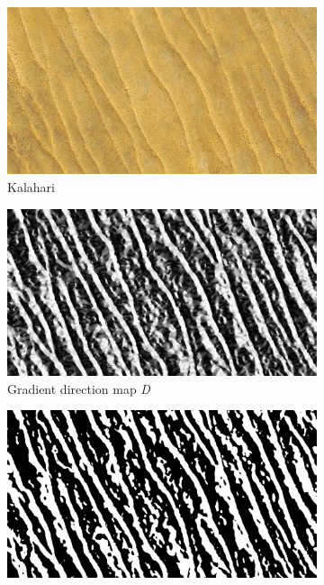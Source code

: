 \begin{figure}[htbp]
	\centering
	\begin{subfigure}[b]{0.3\textwidth}
		\centering
		\includegraphics[width=\linewidth]{figures/kalahari}
		\caption{Kalahari}
		\label{fig:orientation_based_kalahari}
	\end{subfigure}
	\begin{subfigure}[b]{0.3\textwidth}
		\centering
		\includegraphics[width=\linewidth]{figures/gradient_direction_image}
		\caption{Gradient direction map \emph{D}}
		\label{fig:orientation_based_dot_product}
	\end{subfigure}
	\begin{subfigure}[b]{0.3\textwidth}
		\centering
		\includegraphics[width=\linewidth]{figures/gradient_direction_thresholded_image}

\end{subfigure}
\end{figure}
